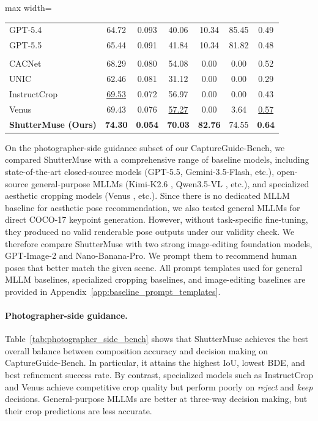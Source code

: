 \documentclass{article} %
\begin{document}
\begin{table}[h]
\begin{adjustbox}{max width=\linewidth}
\begin{tabular}{l|cccccc}
    GPT-5.4~\cite{openai2026gpt54} & 64.72 & 0.093 & 40.06 & 10.34 & 85.45 & 0.49 \\
    GPT-5.5~\cite{openai2026gpt55} & 65.44 & 0.091 & 41.84 & 10.34 & 81.82 & 0.48 \\
    \midrule
    \rowcolor{myblue}\multicolumn{7}{c}{\textbf{Specialized Aesthetic Cropping Models}} \\
    \midrule
    CACNet~\cite{hong2021composing} & 68.29 & 0.080 & 54.08 & 0.00 & 0.00 & 0.52 \\
    UNIC~\cite{liu2023beyond} & 62.46 & 0.081 & 31.12 & 0.00 & 0.00 & 0.29 \\
    InstructCrop~\cite{sheng2025instructcrop} & \underline{69.53} & 0.072 & 56.97 & 0.00 & 0.00 & 0.43 \\
    Venus~\cite{du2026venus} & 69.43 & 0.076 & \underline{57.27} & 0.00 & 3.64 & \underline{0.57} \\
    \midrule
    \textbf{ShutterMuse (Ours)} & \textbf{74.30} & \textbf{0.054} & \textbf{70.03} & \textbf{82.76} & 74.55 & \textbf{0.64} \\
    \bottomrule
  \end{tabular}
  \end{adjustbox}
\end{table}
On the photographer-side guidance subset of our CaptureGuide-Bench, we compared ShutterMuse with a comprehensive range of baseline models, including state-of-the-art closed-source models (GPT-5.5, Gemini-3.5-Flash, etc.), open-source general-purpose MLLMs (Kimi-K2.6 \cite{moonshotai2025kimik26}, Qwen3.5-VL \citep{qwen35blog}, etc.), and specialized aesthetic cropping models (Venus \citep{du2026venus}, etc.). Since there is no dedicated MLLM baseline for aesthetic pose recommendation, we also tested general MLLMs for direct COCO-17 keypoint generation. However, without task-specific fine-tuning, they produced no valid renderable pose outputs under our validity check. We therefore compare ShutterMuse with two strong image-editing foundation models, GPT-Image-2 and
Nano-Banana-Pro. We prompt them to recommend human poses that better match the given scene. All prompt templates used for general MLLM baselines, specialized cropping baselines, and image-editing baselines are provided in Appendix~\ref{app:baseline_prompt_templates}.


\paragraph{Photographer-side guidance.}
Table~\ref{tab:photographer_side_bench} shows that ShutterMuse achieves the best overall balance between composition accuracy and decision making on CaptureGuide-Bench. In particular, it attains the highest IoU, lowest BDE, and best refinement success rate. By contrast, specialized models such as InstructCrop and Venus achieve competitive crop quality but perform poorly on \textit{reject} and \textit{keep} decisions. General-purpose MLLMs are better at three-way decision making, but their crop predictions are less accurate.
\end{document}
